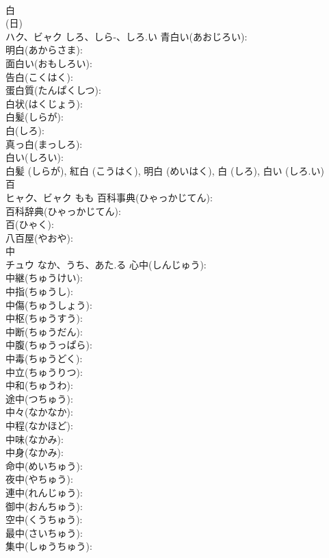 \documentclass[8pt]{extreport}
\begin{document}
\begin{CJK}{UTF8}{min}
\\	白			
\\	(日) 
\\	ハク、ビャク	しろ、しら-、しろ.い	青白い(あおじろい): 
\\	明白(あからさま): 
\\	面白い(おもしろい): 
\\	告白(こくはく): 
\\	蛋白質(たんぱくしつ): 
\\	白状(はくじょう): 
\\	白髪(しらが): 
\\	白(しろ): 
\\	真っ白(まっしろ): 
\\	白い(しろい): 
\\	白髪 (しらが), 紅白 (こうはく), 明白 (めいはく), 白 (しろ), 白い (しろ.い)
\\	百			
\\	ヒャク、ビャク	もも	百科事典(ひゃっかじてん): 
\\	百科辞典(ひゃっかじてん): 
\\	百(ひゃく): 
\\	八百屋(やおや): 
\\	中			
\\	チュウ	なか、うち、あた.る	心中(しんじゅう): 
\\	中継(ちゅうけい): 
\\	中指(ちゅうし): 
\\	中傷(ちゅうしょう): 
\\	中枢(ちゅうすう): 
\\	中断(ちゅうだん): 
\\	中腹(ちゅうっぱら): 
\\	中毒(ちゅうどく): 
\\	中立(ちゅうりつ): 
\\	中和(ちゅうわ): 
\\	途中(つちゅう): 
\\	中々(なかなか): 
\\	中程(なかほど): 
\\	中味(なかみ): 
\\	中身(なかみ): 
\\	命中(めいちゅう): 
\\	夜中(やちゅう): 
\\	連中(れんじゅう): 
\\	御中(おんちゅう): 
\\	空中(くうちゅう): 
\\	最中(さいちゅう): 
\\	集中(しゅうちゅう): 

\end{CJK}
\end{document}
